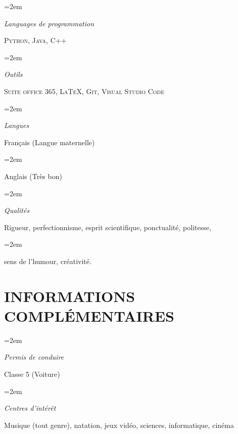 \documentclass[paper=a4,fontsize=11pt]{scrartcl} %
\newlength{\spacebox}
\newcommand{\sepspace}{\vspace*{1em}}		%
\newcommand{\NewPart}[1]{\section*{\uppercase{#1}}}
\newcommand{\PersonalEntry}[2]{
		\noindent\hangindent=2em\hangafter=0 %
		\parbox{\spacebox}{        %
		\textit{#1}}		       %
		\hspace{1.5em} #2 \par}    %
\newcommand{\SkillsEntry}[2]{      %
		\noindent\hangindent=2em\hangafter=0 %
		\parbox{\spacebox}{        %
		\textit{#1}}			   %
		\hspace{1.5em} #2 \par}    %
\begin{document}
\SkillsEntry{Languages de programmation}{\textsc{Python}, \textsc{Java}, \textsc{C++}}
\sepspace
\SkillsEntry{Outils}{\textsc{Suite office 365}, \textsc{LaTeX}, \textsc{Git}, \textsc{Visual Studio Code}}
\sepspace
\SkillsEntry{Langues}{Français (Langue maternelle)}
\SkillsEntry{}{Anglais (Très bon)}
\sepspace
\SkillsEntry{Qualités}{Rigueur, perfectionnisme, esprit scientifique, ponctualité, politesse,}
\SkillsEntry{}{sens de l'humour, créativité.}

\NewPart{Informations complémentaires}{}
\SkillsEntry{Permis de conduire}{Classe 5 (Voiture)}
\sepspace
\SkillsEntry{Centres d'intérêt}{Musique (tout genre), natation, jeux vidéo, sciences, informatique, cinéma}
\end{document}
